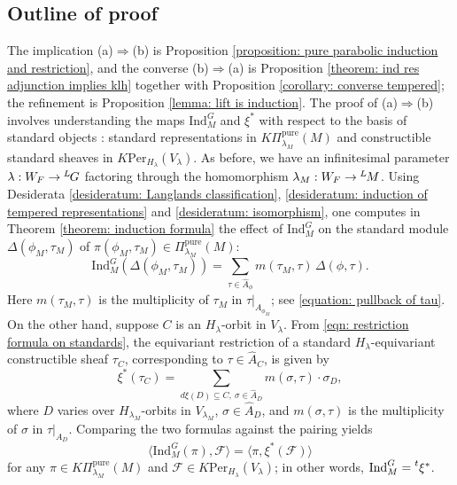 \documentclass[11pt,letterpaper]{amsart}
\newcommand{\irrepdual}[1]{\widehat{#1}}
\newcommand{\Lgroup}[1]{{\hskip-2 pt \,^L\hskip-1pt{#1}}}
\newcommand{\pure}{\mathrm{pure}}
\newcommand{\Ind}{\mathrm{Ind}}
\newcommand{\Per}{\mathrm{Per}}
\newcommand{\stsh}[2]{{#1}_{#2}}
\renewcommand{\1}{\mathbbm{1}}
\numberwithin{equation}{section}
\begin{document}
\subsection{Outline of proof} {The implication (a)$\Rightarrow$(b) is Proposition \ref{proposition: pure parabolic induction and restriction}, and the converse (b)$\Rightarrow$(a) is Proposition \ref{theorem: ind res adjunction implies klh} together with Proposition \ref{corollary: converse tempered}; the refinement is Proposition \ref{lemma: lift is induction}.} The proof  {of (a)$\Rightarrow$(b)} involves understanding the maps $\Ind_M^G$ and $\xi^*$ with respect to the basis of standard objects {:} standard representations in $K\Pi_{\lambda_M}^\pure(M)$ and constructible standard sheaves in $K\Per_{H_\lambda}(V_\lambda)$. As before, we have an infinitesimal parameter $\lambda: W_F\to\Lgroup{G}$  factoring through the homomorphism $\lambda_M: W_F\to\Lgroup{M}$. 
Using Desiderata  {\ref{desideratum: Langlands classification}, \ref{desideratum: induction of tempered representations} and \ref{desideratum: isomorphism}}, one computes  {in Theorem \ref{theorem: induction formula} the effect of $\Ind_M^G$ on the standard module $\Delta(\phi_M,\tau_M)$ of $\pi(\phi_M,\tau_M)\in \Pi_{\lambda_M}^\pure(M)$}: 
\[ {\Ind_M^G(\Delta(\phi_M,\tau_M))=\sum_{\tau \in \irrepdual{A}_\phi} m(\tau_M,\tau)\, \Delta(\phi,\tau).}\]
Here  {$m(\tau_M,\tau)$ is the multiplicity of $\tau_M$ in $\tau\vert_{A_{\phi_M}}$}; see \eqref{equation: pullback of tau}. On the other hand, suppose $C$ is an $H_\lambda$-orbit in $V_\lambda$. From \eqref{eqn: restriction formula on standards},  {the} equivariant restriction of a  {standard} $H_{\lambda}$-equivariant constructible sheaf  {$\stsh{\tau}{C}$}, corresponding to $\tau \in \irrepdual{A}_C$, is given by 
\[
    \xi^*( {\stsh{\tau}{C}}) = \sum_{ {d\xi(D)\subseteq C},~\sigma \in \irrepdual{A}_D} m(\sigma,\tau) \cdot  {\stsh{\sigma}{D}},
\]
where $D$ varies over $H_{\lambda_M}$-orbits in $V_{\lambda_M}$, $\sigma \in \irrepdual{A}_D$, and $m(\sigma,\tau)$ is the multiplicity of $\sigma$ in $\tau \vert_{A_D}$.  {Comparing the two formulas against the pairing yields}
\[\langle \Ind_M^G(\pi), \mathcal{F}\rangle = \langle \pi,  {\xi^*(\mathcal{F})}\rangle\] for any $\pi \in K\Pi_{\lambda_M}^\pure(M)$ and $\mathcal{F}\in K\Per_{H_\lambda}(V_\lambda)$; in other words, $\Ind_M^G=\prescript{t}{}{\xi^*}$.
\end{document}

